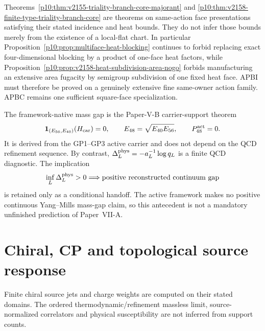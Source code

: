 \documentclass[12pt,a4paper]{article}
\begin{document}
\begin{remark}
\label{p10:rem:v2155-apbc-firewall}
\label{p10:rem:v2158-apbi-firewall}
Theorems~\ref{p10:thm:v2155-triality-branch-core-majorant} and
\ref{p10:thm:v2158-finite-type-triality-branch-core} are theorems on
same-action face presentations satisfying their stated incidence and heat
bounds.  They do not infer those bounds merely from the existence of a
local-flat chart.  In particular
Proposition~\ref{p10:prop:multiface-heat-blocking} continues to forbid
replacing exact four-dimensional blocking by a product of one-face heat
factors, while Proposition~\ref{p10:prop:v2158-heat-subdivision-area-nogo}
forbids manufacturing an extensive area fugacity by semigroup subdivision of
one fixed heat face.  APBI must therefore be proved on a genuinely extensive
fine same-owner action family.  APBC remains one sufficient square-face
specialization.
\end{remark}

\begin{theorem}
\label{p10:thm:v165-native-gap-continuum-boundary}
The framework-native mass gap is the Paper-V-B carrier-support theorem
\[
 \mathbf1_{(E_{56},E_{40})}(H_{\rm car})=0,
 \qquad E_{48}=\sqrt{E_{40}E_{56}},
 \qquad P_{48}^{\rm act}=0.
\]
It is derived from the GP1--GP3 active carrier and does not depend on the QCD
refinement sequence.  By contrast,
\(\Delta_L^{\rm phys}=-a_L^{-1}\log q_L\) is a finite QCD diagnostic.  The
implication
\[
 \inf_L\Delta_L^{\rm phys}>0
 \Longrightarrow \text{positive reconstructed continuum gap}
\]
is retained only as a conditional handoff.  The active framework makes no
positive continuous Yang--Mills mass-gap claim, so this antecedent is not a
mandatory unfinished prediction of Paper~VII-A.
\end{theorem}



\section{Chiral, CP and topological source response}
\label{p10:sec:v237-a5}
Finite chiral source jets and charge weights are computed on their stated domains. The ordered thermodynamic/refinement massless limit, source-normalized correlators and physical susceptibility are not inferred from support counts.

\label{p10:part:native-nonperturbative-readouts}
\end{document}
